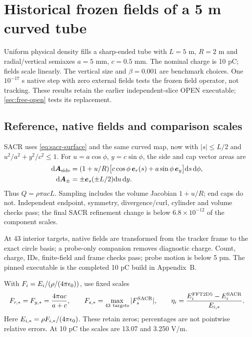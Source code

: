 \clearpage
\section{Historical frozen fields of a 5 m curved tube}
\label{sec:frozen}
Uniform physical density fills a sharp-ended tube with $L=5$ m, $R=2$ m and
radial/vertical semiaxes $a=5$ mm, $c=0.5$ mm. The nominal charge is 10 pC;
fields scale linearly. The vertical size and $\beta=0.001$ are benchmark
choices. One $10^{-17}$ s native step with zero external fields tests the
frozen field operator, not tracking. These results retain the earlier
independent-slice OPEN executable; \cref{sec:free-open} tests its replacement.

\subsection{Reference, native fields and comparison scales}
SACR uses \cref{eq:sacr-surface} and the same curved map, now with
$|s|\le L/2$ and $u^2/a^2+y^2/c^2\le1$. For $u=a\cos\phi$, $y=c\sin\phi$,
the side and cap vector areas are
\begin{align}
 \mathrm d\bm A_{\rm side}&=(1+u/R)
  \big[c\cos\phi\,\bm e_r(s)+a\sin\phi\,\bm e_y\big]\mathrm d s\,\mathrm d\phi,\nonumber\\
 \mathrm d\bm A_\pm&=\pm\bm e_s(\pm L/2)\mathrm d u\,\mathrm d y.
 \label{eq:frozen-area}
\end{align}
Thus $Q=\rho\pi acL$. Sampling includes the volume Jacobian $1+u/R$;
end caps do not. Independent endpoint, symmetry, divergence/curl, cylinder
and volume checks pass; the final SACR refinement change is below
$6.8\times10^{-12}$ of the component scales.

At 43 interior targets, native fields are transformed from the tracker frame
to the exact circle basis; a probe-only companion removes diagnostic charge.
Count, charge, IDs, finite-field and frame checks pass; probe motion is below
5 pm. The pinned executable is the completed 10 pC build in Appendix~B.

With $F_i=E_i/(\rho/(4\pi\epsilon_0))$, use fixed scales
\begin{equation}
 F_{r,*}=F_{y,*}=\frac{4\pi ac}{a+c},\qquad
 F_{s,*}=\max_{43\ {\rm targets}}|F_s^{\rm SACR}|,\qquad
 \eta_i=\frac{E_i^{\rm FFT2D5}-E_i^{\rm SACR}}{E_{i,*}}.
 \label{eq:frozen-scales}
\end{equation}
Here $E_{i,*}=\rho F_{i,*}/(4\pi\epsilon_0)$. These retain zeros; percentages are
not pointwise relative errors. At 10 pC the scales are 13.07 and 3.250 V/m.

